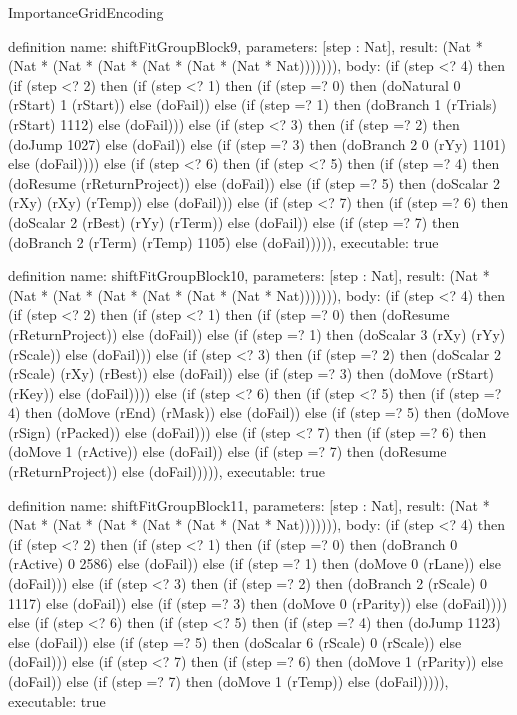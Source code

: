 \begin{lexlean}{ImportanceGridEncoding}
\begin{semanticmodule}
definition{
  name: shiftFitGroupBlock9,
  parameters: [step : Nat],
  result: (Nat * (Nat * (Nat * (Nat * (Nat * (Nat * (Nat * Nat))))))),
  body: (if (step <? 4) then
      (if (step <? 2) then
      (if (step <? 1) then
      (if (step =? 0) then (doNatural 0 (rStart) 1 (rStart)) else (doFail)) else
      (if (step =? 1) then (doBranch 1 (rTrials) (rStart) 1112) else (doFail))) else
      (if (step <? 3) then
      (if (step =? 2) then (doJump 1027) else (doFail)) else
      (if (step =? 3) then (doBranch 2 0 (rYy) 1101) else (doFail)))) else
      (if (step <? 6) then
      (if (step <? 5) then
      (if (step =? 4) then (doResume (rReturnProject)) else (doFail)) else
      (if (step =? 5) then (doScalar 2 (rXy) (rXy) (rTemp)) else (doFail))) else
      (if (step <? 7) then
      (if (step =? 6) then (doScalar 2 (rBest) (rYy) (rTerm)) else (doFail)) else
      (if (step =? 7) then (doBranch 2 (rTerm) (rTemp) 1105) else (doFail))))),
  executable: true
}

definition{
  name: shiftFitGroupBlock10,
  parameters: [step : Nat],
  result: (Nat * (Nat * (Nat * (Nat * (Nat * (Nat * (Nat * Nat))))))),
  body: (if (step <? 4) then
      (if (step <? 2) then
      (if (step <? 1) then
      (if (step =? 0) then (doResume (rReturnProject)) else (doFail)) else
      (if (step =? 1) then (doScalar 3 (rXy) (rYy) (rScale)) else (doFail))) else
      (if (step <? 3) then
      (if (step =? 2) then (doScalar 2 (rScale) (rXy) (rBest)) else (doFail)) else
      (if (step =? 3) then (doMove (rStart) (rKey)) else (doFail)))) else
      (if (step <? 6) then
      (if (step <? 5) then
      (if (step =? 4) then (doMove (rEnd) (rMask)) else (doFail)) else
      (if (step =? 5) then (doMove (rSign) (rPacked)) else (doFail))) else
      (if (step <? 7) then
      (if (step =? 6) then (doMove 1 (rActive)) else (doFail)) else
      (if (step =? 7) then (doResume (rReturnProject)) else (doFail))))),
  executable: true
}

definition{
  name: shiftFitGroupBlock11,
  parameters: [step : Nat],
  result: (Nat * (Nat * (Nat * (Nat * (Nat * (Nat * (Nat * Nat))))))),
  body: (if (step <? 4) then
      (if (step <? 2) then
      (if (step <? 1) then
      (if (step =? 0) then (doBranch 0 (rActive) 0 2586) else (doFail)) else
      (if (step =? 1) then (doMove 0 (rLane)) else (doFail))) else
      (if (step <? 3) then
      (if (step =? 2) then (doBranch 2 (rScale) 0 1117) else (doFail)) else
      (if (step =? 3) then (doMove 0 (rParity)) else (doFail)))) else
      (if (step <? 6) then
      (if (step <? 5) then
      (if (step =? 4) then (doJump 1123) else (doFail)) else
      (if (step =? 5) then (doScalar 6 (rScale) 0 (rScale)) else (doFail))) else
      (if (step <? 7) then
      (if (step =? 6) then (doMove 1 (rParity)) else (doFail)) else
      (if (step =? 7) then (doMove 1 (rTemp)) else (doFail))))),
  executable: true
}


\end{semanticmodule}
\end{lexlean}
